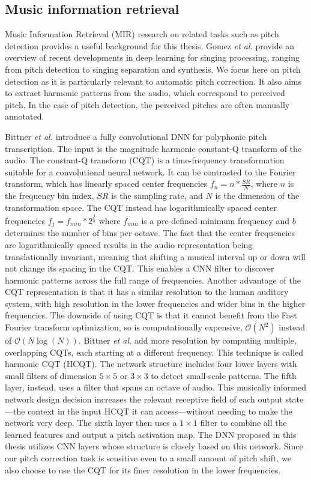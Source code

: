 \subsection{Music information retrieval}
Music Information Retrieval (MIR) research on related tasks such as pitch detection provides a useful background for this thesis. Gomez {\it et al.}\cite{gomez2018deep} provide an overview of recent developments in deep learning for singing processing, ranging from pitch detection to singing separation and synthesis. We focus here on pitch detection as it is particularly relevant to automatic pitch correction. It also aims to extract harmonic patterns from the audio, which correspond to perceived pitch. In the case of pitch detection, the perceived pitches are often manually annotated. 

Bittner \textit{et al.} introduce a fully convolutional DNN for polyphonic pitch transcription. The input is the magnitude harmonic constant-Q transform of the audio. The constant-Q transform (CQT) is a time-frequency transformation suitable for a convolutional neural network. It can be contrasted to the Fourier transform, which has linearly spaced center frequencies $f_n = n * \frac{SR}{N}$, where $n$ is the frequency bin index, $SR$ is the sampling rate, and $N$ is the dimension of the transformation space. The CQT instead has logarithmically spaced center frequencies $f_j = f_{min} * 2^{\frac{j}{b}}$ where $f_{min}$ is a pre-defined minimum frequency and $b$ determines the number of bins per octave. The fact that the center frequencies are logarithmically spaced results in the audio representation being translationally invariant, meaning that shifting a musical interval up or down will not change its spacing in the CQT. This enables a CNN filter to discover harmonic patterns across the full range of frequencies. Another advantage of the CQT representation is that it has a similar resolution to the human auditory system, with high resolution in the lower frequencies and wider bins in the higher frequencies. The downside of using CQT is that it cannot benefit from the Fast Fourier transform optimization, so is computationally expensive, $\mathcal{O}(N^2)$ instead of $\mathcal{O}(N \log (N))$. Bittner \textit{et al.} add more resolution by computing multiple, overlapping CQTs, each starting at a different frequency. This technique is called harmonic CQT (HCQT). The network structure includes four lower layers with small filters of dimension $5 \times 5$ or $3 \times 3$ to detect small-scale patterns. The fifth layer, instead, uses a filter that spans an octave of audio. This musically informed network design decision increases the relevant receptive field of each output state---the context in the input HCQT it can access---without needing to make the network very deep. The sixth layer then uses a $1 \times 1$ filter to combine all the learned features and output a pitch activation map. \cite{bittner2017deep} The DNN proposed in this thesis utilizes CNN layers whose structure is closely based on this network. Since our pitch correction task is sensitive even to a small amount of pitch shift, we also choose to use the CQT for its finer resolution in the lower frequencies. 

